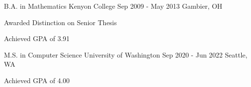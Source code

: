 
\begin{minipage}[t]{.49\textwidth}
\begin{cventries}
  \cventry
  {B.A. in Mathematics}
    {Kenyon College}
    {Sep 2009 - May 2013}
    {Gambier, OH}
    {
      \begin{cvitems}
        \item {Awarded Distinction on Senior Thesis}
        \item {Achieved GPA of 3.91}
      \end{cvitems}
    }
\end{cventries}
\end{minipage}
\hspace{.02\textwidth}
\begin{minipage}[t]{.49\textwidth}
\begin{cventries}
  \cventry
  {M.S. in Computer Science}
    {University of Washington}
    {Sep 2020 - Jun 2022}
    {Seattle, WA}
    {
      \begin{cvitems}
        \item {Achieved GPA of 4.00}
      \end{cvitems}
    }
\end{cventries}
\end{minipage}
